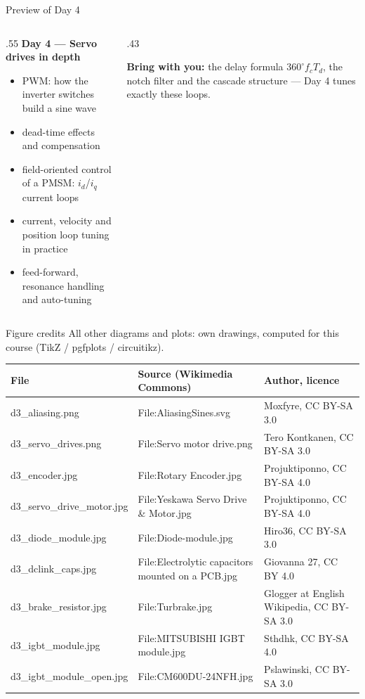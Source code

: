 \documentclass[aspectratio=169,10pt]{beamer}
\begin{document}
\begin{frame}{Preview of Day 4}
\begin{columns}[T]
\begin{column}{.55\textwidth}
\small
\textbf{Day 4 --- Servo drives in depth}
\begin{itemize}\setlength\itemsep{.5mm}
\item PWM: how the inverter switches build a sine wave
\item dead-time effects and compensation
\item field-oriented control of a PMSM: $i_d$/$i_q$ current loops
\item current, velocity and position loop tuning in practice
\item feed-forward, resonance handling and auto-tuning
\end{itemize}
\end{column}
\begin{column}{.43\textwidth}
\begin{notebox}
\textbf{Bring with you:} the delay formula $360^\circ f_cT_d$, the notch filter and the cascade structure --- Day 4 tunes exactly these loops.
\end{notebox}
\end{column}
\end{columns}
\end{frame}

\begin{frame}{Figure credits}
\scriptsize
All other diagrams and plots: own drawings, computed for this course (TikZ / pgfplots / circuitikz).\\[1mm]
\begin{tabularx}{\textwidth}{@{}l X l@{}}
\toprule
\textbf{File} & \textbf{Source (Wikimedia Commons)} & \textbf{Author, licence}\\
\midrule
d3\_aliasing.png & File:AliasingSines.svg & Moxfyre, CC BY-SA 3.0\\
d3\_servo\_drives.png & File:Servo motor drive.png & Tero Kontkanen, CC BY-SA 3.0\\
d3\_encoder.jpg & File:Rotary Encoder.jpg & Projuktiponno, CC BY-SA 4.0\\
d3\_servo\_drive\_motor.jpg & File:Yeskawa Servo Drive \& Motor.jpg & Projuktiponno, CC BY-SA 4.0\\
d3\_diode\_module.jpg & File:Diode-module.jpg & Hiro36, CC BY-SA 3.0\\
d3\_dclink\_caps.jpg & File:Electrolytic capacitors mounted on a PCB.jpg & Giovanna 27, CC BY 4.0\\
d3\_brake\_resistor.jpg & File:Turbrake.jpg & Glogger at English Wikipedia, CC BY-SA 3.0\\
d3\_igbt\_module.jpg & File:MITSUBISHI IGBT module.jpg & Sthdhk, CC BY-SA 4.0\\
d3\_igbt\_module\_open.jpg & File:CM600DU-24NFH.jpg & Pslawinski, CC BY-SA 3.0\\
\bottomrule
\end{tabularx}
\end{frame}
\end{document}

